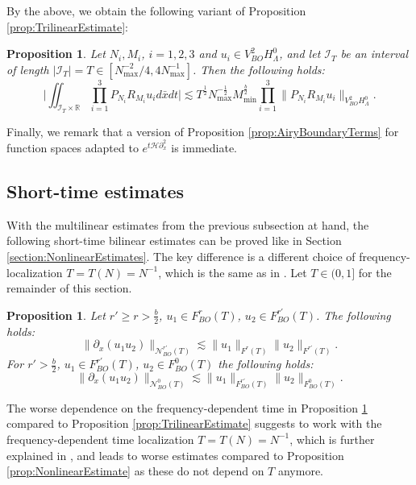 \documentclass{amsart}
\newtheorem{proposition}[theorem]{Proposition}
\theoremstyle{definition}
\newcommand{\R}{\mathbb{R}}
\begin{document}
By the above, we obtain the following variant of Proposition \ref{prop:TrilinearEstimate}:
\begin{proposition}
\label{prop:TrilinearEstimateProp}
Let $N_i,M_i$, $i=1,2,3$ and $u_i \in V^2_{BO} H^0_{\Lambda}$, and let $\mathcal{I}_T$ be an interval of length $|\mathcal{I}_T| = T \in [N_{\max}^{-2}/4,4N_{\max}^{-1}]$. Then the following holds:
\begin{equation*}
\big| \iint_{\mathcal{I}_T \times \R} \prod_{i=1}^3 P_{N_i} R_{M_i} u_i d \bar{x} dt \big| \lesssim T^{\frac{1}{2}} N_{\max}^{-\frac{1}{2}} M_{\min}^{\frac{b}{2}} \prod_{i=1}^3 \|P_{N_i} R_{M_i} u_i \|_{V^2_{BO} H^0_{\Lambda}}.
\end{equation*}
\end{proposition}
Finally, we remark that a version of Proposition \ref{prop:AiryBoundaryTerms} for function spaces adapted to $e^{t \mathcal{H} \partial_x^2}$ is immediate. 

\subsection{Short-time estimates}

With the multilinear estimates from the previous subsection at hand, the following short-time bilinear estimates can be proved like in Section \ref{section:NonlinearEstimates}. The key difference is a different choice of frequency-localization $T=T(N)=N^{-1}$, which is the same as in \cite[Section~3]{ShorttimeFourierTransformRestriction}. Let $T \in (0,1]$ for the remainder of this section.
\begin{proposition}
Let $r' \geq r > \frac{b}{2}$, $u_1 \in F_{BO}^r(T)$, $u_2 \in F^{r'}_{BO}(T)$. The following holds:
\begin{equation*}
\| \partial_x (u_1 u_2) \|_{\mathcal{N}^{r'}_{BO}(T)} \lesssim \| u_1 \|_{F^r(T)} \| u_2 \|_{F^{r'}(T)}.
\end{equation*}
For $r' > \frac{b}{2}$, $u_1 \in F_{BO}^{r'}(T)$, $u_2 \in F^{0}_{BO}(T)$ the following holds:
\begin{equation*}
\| \partial_x (u_1 u_2) \|_{\mathcal{N}^0_{BO}(T)} \lesssim \| u_1 \|_{F^{r'}_{BO}(T)} \| u_2 \|_{F^0_{BO}(T)}.
\end{equation*}
\end{proposition}
The worse dependence on the frequency-dependent time in Proposition \ref{prop:TrilinearEstimateProp} compared to Proposition \ref{prop:TrilinearEstimate} suggests to work with the frequency-dependent time localization $T=T(N)=N^{-1}$, which is further explained in \cite[Section~3]{ShorttimeFourierTransformRestriction}, and leads to worse estimates compared to Proposition \ref{prop:NonlinearEstimate} as these do not depend on $T$ anymore.
\end{document}
